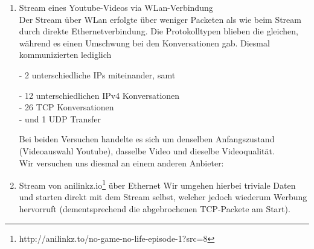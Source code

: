 \documentclass[11pt]{article}
\begin{document}
\begin{enumerate}
\begin{enumerate}[\thesection .1]
\begin{addmargin}[1em]{1em}
                - 6 unterschiedliche IPs miteinander kommunizierten und im Rahmen dieser
                \begin{addmargin}[1em]{1em}
                    - 19 unterschiedliche IPv4 Konversationen erfolgten\\
                    - 16 Konversationen über TCP verliefen\\
                    - 4 UDP Transfers stattfanden\\
                \end{addmargin}
            \end{addmargin}
            Ein Objektzugriff über HTTP erfolgte hier erstaunlicherweise nicht, was jedoch mit der Implementierung seitens Youtube zusammenhängt.\\

        Wir starten einen neuen Sniff-Versuch, nun jedoch über das WLan unseres Heimnetzwerkes.
        \item Stream eines Youtube-Videos via WLan-Verbindung\\
        Der Stream über WLan erfolgte über weniger Packeten als wie beim Stream durch direkte Ethernetverbindung.
        Die Protokolltypen blieben die gleichen, während es einen Umschwung bei den Konversationen gab.
        Diesmal kommunizierten lediglich
        \begin{addmargin}[1em]{1em}
            - 2 unterschiedliche IPs miteinander, samt
            \begin{addmargin}[1em]{1em}
                - 12 unterschiedlichen IPv4 Konversationen\\
                - 26 TCP Konversationen\\
                - und 1 UDP Transfer\\
            \end{addmargin}
        \end{addmargin}

            Bei beiden Versuchen handelte es sich um denselben Anfangszustand (Videoauswahl Youtube),
            dasselbe Video und dieselbe Videoqualität.\\

            Wir versuchen uns diesmal an einem anderen Anbieter:
            \item Stream von anilinkz.io\footnote[1]{http://anilinkz.to/no-game-no-life-episode-1?src=8} über Ethernet
            Wir umgehen hierbei triviale Daten und starten direkt mit dem Stream selbst, welcher jedoch wiederum Werbung hervorruft
            (dementsprechend die abgebrochenen TCP-Packete am Start).


\end{enumerate}
\end{enumerate}
\end{document}
